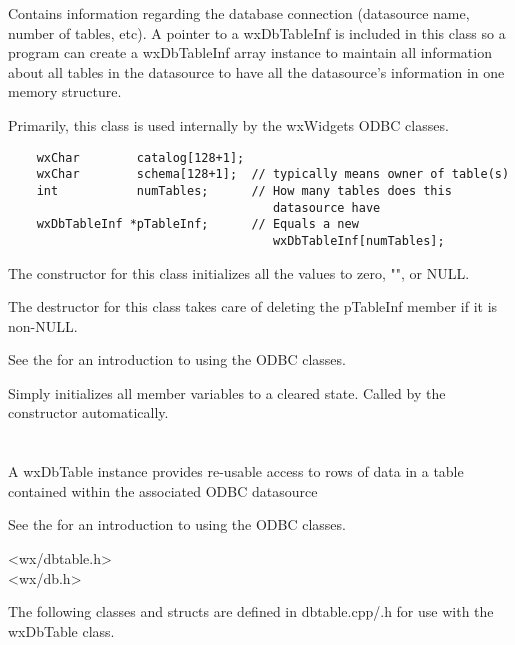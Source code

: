 Contains information regarding the database connection (datasource name,
number of tables, etc).  A pointer to a wxDbTableInf is included in this
class so a program can create a wxDbTableInf array instance to maintain all
information about all tables in the datasource to have all the datasource's
information in one memory structure.

Primarily, this class is used internally by the wxWidgets ODBC classes.

\begin{verbatim}
    wxChar        catalog[128+1];
    wxChar        schema[128+1];  // typically means owner of table(s)
    int           numTables;      // How many tables does this
                                     datasource have
    wxDbTableInf *pTableInf;      // Equals a new
                                     wxDbTableInf[numTables];
\end{verbatim}

The constructor for this class initializes all the values to zero, "", or NULL.

The destructor for this class takes care of deleting the pTableInf member if
it is non-NULL.

See the  for
an introduction to using the ODBC classes.

\label{wxdbinfinitialize}

Simply initializes all member variables to a cleared state.  Called by
the constructor automatically.

\section{}\label{wxdbtable}

A wxDbTable instance provides re-usable access to rows of data in
a table contained within the associated ODBC datasource

See the  for
an introduction to using the ODBC classes.


<wx/dbtable.h>\\
<wx/db.h>


The following classes and structs are defined in dbtable.cpp/.h for use
with the wxDbTable class.

